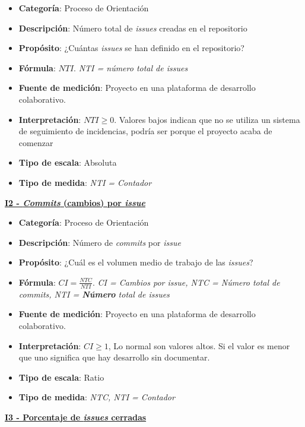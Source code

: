 \begin{itemize}
	\item \textbf{Categoría}: Proceso de Orientación
	\item \textbf{Descripción}: Número total de \textit{issues} creadas en el repositorio
	\item \textbf{Propósito}: ¿Cuántas \textit{issues} se han definido en el repositorio?
	\item \textbf{Fórmula}: $NTI$. \textit{NTI = número total de \textit{issues}}
	\item \textbf{Fuente de medición}: Proyecto en una plataforma de desarrollo colaborativo.
	\item \textbf{Interpretación}: $NTI \geq 0$. Valores bajos indican que no se utiliza un sistema de seguimiento de incidencias, podría ser porque el proyecto acaba de comenzar
	\item \textbf{Tipo de escala}: Absoluta
	\item \textbf{Tipo de medida}: \textit{NTI = Contador}
\end{itemize}

\textbf{\underline{I2 - \textit{Commits} (cambios) por \textit{issue}}}

\begin{itemize}
	\item \textbf{Categoría}: Proceso de Orientación
	\item \textbf{Descripción}: Número de \textit{commits} por \textit{issue}
	\item \textbf{Propósito}: ¿Cuál es el volumen medio de trabajo de las \textit{issues}?
	\item \textbf{Fórmula}: $CI = \frac{NTC}{NTI}$. \textit{CI = Cambios por \textit{issue}, NTC = Número total de \textit{commits}, NTI = \textbf{Número} total de \textit{issues}}
	\item \textbf{Fuente de medición}: Proyecto en una plataforma de desarrollo colaborativo.
	\item \textbf{Interpretación}: $CI \geq 1$, Lo normal son valores altos. Si el valor es menor que uno significa que hay desarrollo sin documentar.
	\item \textbf{Tipo de escala}: Ratio 
	\item \textbf{Tipo de medida}: \textit{NTC, NTI = Contador}
\end{itemize}

\textbf{\underline{I3 - Porcentaje de \textit{issues} cerradas}}

